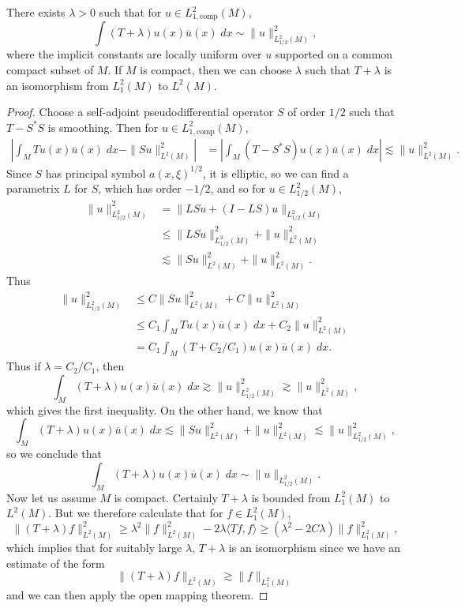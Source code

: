 \begin{lemma}
    There exists $\lambda > 0$ such that for $u \in L^2_{1,\text{comp}}(M)$,
    \[ \int (T + \lambda) u(x) \overline{u}(x)\; dx \sim \| u \|_{L^2_{1/2}(M)}^2, \]
    where the implicit constants are locally uniform over $u$ supported on a common compact subset of $M$. If $M$ is compact, then we can choose $\lambda$ such that $T + \lambda$ is an isomorphism from $L^2_1(M)$ to $L^2(M)$.
\end{lemma}
\begin{proof}
    Choose a self-adjoint pseudodifferential operator $S$ of order $1/2$ such that $T - S^* S$ is smoothing. Then for $u \in L^2_{1,\text{comp}}(M)$,
    \begin{align*}
        \left| \int_M Tu(x) \overline{u}(x)\; dx - \| Su \|_{L^2(M)}^2 \right| &= \left| \int_M (T - S^* S) u(x) \overline{u}(x)\; dx \right| \lesssim \| u \|_{L^2(M)}^2.
    \end{align*}
    Since $S$ has principal symbol $a(x,\xi)^{1/2}$, it is elliptic, so we can find a parametrix $L$ for $S$, which has order $-1/2$, and so for $u \in L^2_{1/2}(M)$,
    \begin{align*}
        \| u \|_{L^2_{1/2}(M)}^2 &= \| LSu + (I - LS)u \|_{L^2_{1/2}(M)}\\
        &\leq \| LSu \|_{L^2_{1/2}(M)}^2 + \| u \|_{L^2(M)}^2\\
        &\lesssim \| Su \|_{L^2(M)}^2 + \| u \|_{L^2(M)}^2.
    \end{align*}
    Thus
    \begin{align*}
        \| u \|_{L^2_{1/2}(M)}^2 &\leq C \| S u \|_{L^2(M)}^2 + C \| u \|_{L^2(M)}^2\\
        &\leq C_1 \int_M Tu(x) \overline{u}(x)\; dx + C_2 \| u \|_{L^2(M)}^2\\
        &= C_1 \int_M (T + C_2/C_1) u(x) \overline{u}(x)\; dx.
    \end{align*}
    Thus if $\lambda = C_2 / C_1$, then
    \[ \int_M (T + \lambda) u(x) \overline{u}(x)\; dx \gtrsim \| u \|_{L^2_{1/2}(M)}^2 \gtrsim \| u \|_{L^2(M)}^2, \]
    which gives the first inequality. On the other hand, we know that
    \[ \int_M (T + \lambda) u(x) \overline{u}(x)\; dx \lesssim \| Su \|_{L^2(M)}^2 + \| u \|_{L^2(M)}^2 \lesssim \| u \|_{L^2_{1/2}(M)}^2, \]
    so we conclude that
    \[ \int_M (T + \lambda) u(x) \overline{u}(x)\; dx \sim \| u \|_{L^2_{1/2}(M)}. \]
    Now let us assume $M$ is compact. Certainly $T + \lambda$ is bounded from $L^2_1(M)$ to $L^2(M)$. But we therefore calculate that for $f \in L^2_1(M)$,
    \[ \| (T + \lambda) f \|_{L^2(M)}^2 \geq \lambda^2 \| f \|_{L^2(M)}^2 - 2 \lambda \langle Tf, f \rangle \geq (\lambda^2 - 2C \lambda) \| f \|_{L^2_1(M)}^2, \]
    which implies that for suitably large $\lambda$, $T + \lambda$ is an isomorphism since we have an estimate of the form
    \[ \| (T + \lambda) f \|_{L^2(M)} \gtrsim \| f \|_{L^2_1(M)} \]
    and we can then apply the open mapping theorem.
\end{proof}

